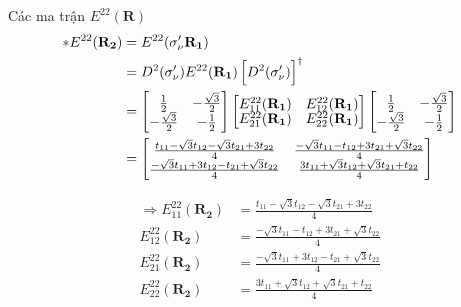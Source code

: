 \documentclass{article}
\begin{document}
Các ma trận $E^{22}(\mathbf{R})$
\begin{align*}
    \ast E^{22} (\mathbf{R_2})
     & =  E^{22} (\sigma'_\nu \mathbf{R_1})                                             \\
     & = D^2(\sigma'_\nu)  E^{22}(\mathbf{R_1}) \left[ D^2(\sigma'_\nu) \right]^\dagger \\
     &
    =
    \begin{bmatrix}
        \renewcommand{\arraystretch}{0.72}
        \frac{1}{2}         & -\frac{\sqrt{3}}{2} \\
        -\frac{\sqrt{3}}{2} & -\frac{1}{2}
    \end{bmatrix}
    \begin{bmatrix}
        E_{11}^{22}(\mathbf{R_1}) & E_{12}^{22}(\mathbf{R_1}) \\
        E_{21}^{22}(\mathbf{R_1}) & E_{22}^{22}(\mathbf{R_1})
    \end{bmatrix}
    \begin{bmatrix}
        \frac{1}{2}         & -\frac{\sqrt{3}}{2} \\
        -\frac{\sqrt{3}}{2} & -\frac{1}{2}
    \end{bmatrix}                            \\
     & =
    \begin{bmatrix}
        \frac{t_{11} - \sqrt{3}t_{12} - \sqrt{3}t_{21} + 3t_{22}}{4}  & \frac{-\sqrt{3}t_{11} - t_{12} + 3t_{21} + \sqrt{3}t_{22}}{4} \\
        \frac{-\sqrt{3}t_{11} + 3t_{12} - t_{21} + \sqrt{3}t_{22}}{4} & \frac{3t_{11} + \sqrt{3}t_{12} + \sqrt{3}t_{21} + t_{22}}{4}
    \end{bmatrix}
\end{align*}

\begin{align*}
    \Rightarrow E_{11}^{22}(\mathbf{R_2}) & = \frac{t_{11} - \sqrt{3}t_{12} - \sqrt{3}t_{21} + 3t_{22}}{4}  \\
    E_{12}^{22}(\mathbf{R_2})             & = \frac{-\sqrt{3}t_{11} - t_{12} + 3t_{21} + \sqrt{3}t_{22}}{4} \\
    E_{21}^{22}(\mathbf{R_2})             & = \frac{-\sqrt{3}t_{11} + 3t_{12} - t_{21} + \sqrt{3}t_{22}}{4} \\
    E_{22}^{22}(\mathbf{R_2})             & = \frac{3t_{11} + \sqrt{3}t_{12} + \sqrt{3}t_{21} + t_{22}}{4}  \\
\end{align*}
\end{document}
